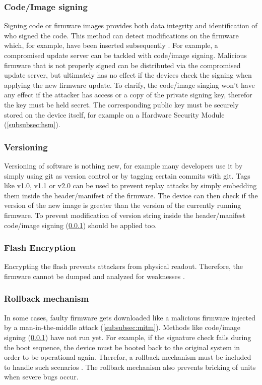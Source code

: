 \subsubsection{Code/Image signing}\label{subsubsec:code-image-signing}
Signing code or firmware images provides both data integrity and identification of who signed the code. This method can detect modifications on the firmware which, for example, have been inserted subsequently \cite{Cooper2018}. For example, a compromised update server can be tackled with code/image signing. Malicious firmware that is not properly signed can be distributed via the compromised update server, but ultimately has no effect if the devices check the signing when applying the new firmware update. To clarify, the code/image singing won't have any effect if the attacker has access or a copy of the private signing key, therefor the key must be held secret. The corresponding public key must be securely stored on the device itself, for example on a Hardware Security Module (\ref{subsubsec:hsm}).

\subsubsection{Versioning}\label{subsubsec:versioning}
Versioning of software is nothing new, for example many developers use it by simply using git as version control or by tagging certain commits with git. Tags like v1.0, v1.1 or v2.0 can be used to prevent replay attacks by simply embedding them inside the header/manifest of the firmware. The device can then check if the version of the new image is greater than the version of the currently running firmware. To prevent modification of version string inside the header/manifest code/image signing (\ref{subsubsec:code-image-signing}) should be applied too.

\subsubsection{Flash Encryption}\label{subsubsec:flash-encryption}
Encrypting the flash prevents attackers from physical readout. Therefore, the firmware cannot be dumped and analyzed for weaknesses \cite{EspressifSystemsShanghaiCo}.

\subsubsection{Rollback mechanism}\label{subsubsec:rollback-mechanism}
In some cases, faulty firmware gets downloaded like a malicious firmware injected by a man-in-the-middle attack (\ref{subsubsec:mitm}). Methods like code/image signing (\ref{subsubsec:code-image-signing}) have not run yet. For example, if the signature check fails during the boot sequence, the device must be booted back to the original system in order to be operational again. Therefor, a rollback mechanism must be included to handle such scenarios \cite{Bettayeb2019}. The rollback mechanism also prevents bricking of units when severe bugs occur.

